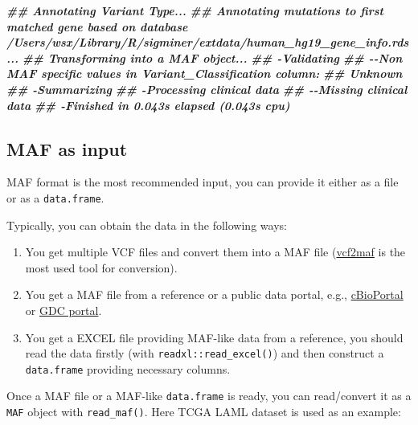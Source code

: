 \documentclass[
  12pt,
  a4paper,
  twoside]{book}
\newenvironment{Shaded}{\begin{snugshade}}{\end{snugshade}}
\newcommand{\DocumentationTok}[1]{\textcolor[rgb]{0.56,0.35,0.01}{\textbf{\textit{#1}}}}
\providecommand{\tightlist}{%
  \setlength{\itemsep}{0pt}\setlength{\parskip}{0pt}}
\begin{document}
\begin{Shaded}
\begin{Highlighting}[]
\DocumentationTok{\#\# Annotating Variant Type...}
\DocumentationTok{\#\# Annotating mutations to first matched gene based on database /Users/wsx/Library/R/sigminer/extdata/human\_hg19\_gene\_info.rds...}
\DocumentationTok{\#\# Transforming into a MAF object...}
\DocumentationTok{\#\# {-}Validating}
\DocumentationTok{\#\# {-}{-}Non MAF specific values in Variant\_Classification column:}
\DocumentationTok{\#\#   Unknown}
\DocumentationTok{\#\# {-}Summarizing}
\DocumentationTok{\#\# {-}Processing clinical data}
\DocumentationTok{\#\# {-}{-}Missing clinical data}
\DocumentationTok{\#\# {-}Finished in 0.043s elapsed (0.043s cpu)}
\end{Highlighting}
\end{Shaded}

\hypertarget{maf-as-input}{%
\subsection{MAF as input}\label{maf-as-input}}

MAF format is the most recommended input, you can provide it either as a file or as a \texttt{data.frame}.

Typically, you can obtain the data in the following ways:

\begin{enumerate}
\def\labelenumi{\arabic{enumi}.}
\tightlist
\item
  You get multiple VCF files and convert them into a MAF file (\href{https://github.com/mskcc/vcf2maf}{vcf2maf} is the most used tool for conversion).
\item
  You get a MAF file from a reference or a public data portal, e.g., \href{http://www.cbioportal.org/}{cBioPortal} or \href{https://portal.gdc.cancer.gov/}{GDC portal}.
\item
  You get a EXCEL file providing MAF-like data from a reference, you should read the data firstly (with \texttt{readxl::read\_excel()}) and then construct a \texttt{data.frame} providing necessary columns.
\end{enumerate}

Once a MAF file or a MAF-like \texttt{data.frame} is ready, you can read/convert it as a \texttt{MAF} object with \texttt{read\_maf()}. Here TCGA LAML dataset is used as an example:
\end{document}
